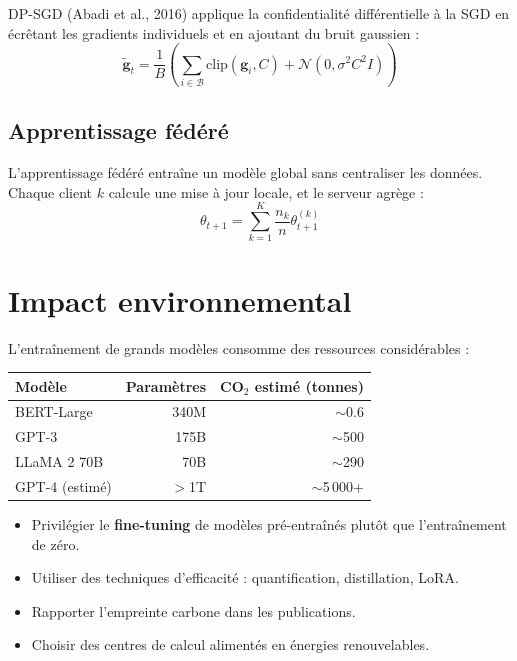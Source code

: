 DP-SGD (Abadi et al., 2016) applique la confidentialit\'e diff\'erentielle \`a la SGD en \'ecr\^etant les gradients individuels et en ajoutant du bruit gaussien :
\[
\tilde{\bm{g}}_t = \frac{1}{B}\left(\sum_{i \in \mathcal{B}} \mathrm{clip}(\bm{g}_i, C) + \mathcal{N}(0, \sigma^2 C^2 I)\right)
\]

\subsection{Apprentissage f\'ed\'er\'e}

L'apprentissage f\'ed\'er\'e entra\^ine un mod\`ele global sans centraliser les donn\'ees. Chaque client $k$ calcule une mise \`a jour locale, et le serveur agr\`ege :
\[
\theta_{t+1} = \sum_{k=1}^K \frac{n_k}{n} \theta_{t+1}^{(k)}
\]

\section{Impact environnemental}
\label{sec:environment}

L'entra\^inement de grands mod\`eles consomme des ressources consid\'erables :

\begin{center}
\begin{tabular}{lrr}
\toprule
\textbf{Mod\`ele} & \textbf{Param\`etres} & \textbf{CO$_2$ estim\'e (tonnes)} \\
\midrule
BERT-Large & 340M & $\sim$0.6 \\
GPT-3 & 175B & $\sim$500 \\
LLaMA 2 70B & 70B & $\sim$290 \\
GPT-4 (estim\'e) & $>$1T & $\sim$5\,000+ \\
\bottomrule
\end{tabular}
\end{center}

\begin{bonnepratique}
\begin{itemize}
\item Privil\'egier le \textbf{fine-tuning} de mod\`eles pr\'e-entra\^in\'es plut\^ot que l'entra\^inement de z\'ero.
\item Utiliser des techniques d'efficacit\'e : quantification, distillation, LoRA.
\item Rapporter l'empreinte carbone dans les publications.
\item Choisir des centres de calcul aliment\'es en \'energies renouvelables.
\end{itemize}
\end{bonnepratique}

